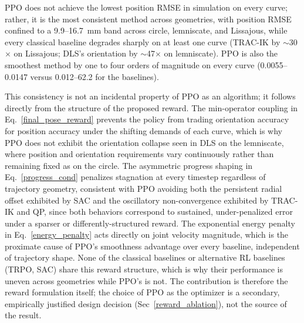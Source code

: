 \documentclass[preprint,12pt]{elsarticle}
\begin{document}
PPO does not achieve the lowest position RMSE in simulation on every
curve; rather, it is the most consistent method across geometries, with
position RMSE confined to a 9.9--16.7~mm band across circle, lemniscate,
and Lissajous, while every classical baseline degrades sharply on at
least one curve (TRAC-IK by $\sim$30$\times$ on Lissajous; DLS's
orientation by $\sim$47$\times$ on lemniscate). PPO is also the smoothest
method by one to four orders of magnitude on every curve
(0.0055--0.0147 versus 0.012--62.2 for the baselines).

This consistency is not an incidental property of PPO as an algorithm;
it follows directly from the structure of the proposed reward. The
min-operator coupling in Eq.~\ref{final_pose_reward} prevents the policy from trading orientation accuracy for position accuracy under the shifting demands of each curve, which is why PPO does not exhibit the orientation collapse seen in DLS on the lemniscate, where position and orientation
requirements vary continuously rather than remaining fixed as on the
circle. The asymmetric progress shaping in Eq.~\ref{progress_cond} penalizes stagnation at every timestep regardless of trajectory geometry, consistent with PPO avoiding both the persistent radial offset exhibited by SAC and the oscillatory non-convergence exhibited by TRAC-IK and QP, since both behaviors correspond to sustained, under-penalized error under a sparser or differently-structured reward. The exponential energy penalty in Eq.~\ref{energy_penalty} acts directly on joint velocity magnitude, which is the proximate cause of PPO's smoothness advantage over every baseline, independent of trajectory shape. None of the classical baselines or alternative RL baselines (TRPO, SAC) share this reward structure, which is why their performance is uneven across geometries while PPO's is not. The contribution is therefore the reward formulation itself; the choice of
PPO as the optimizer is a secondary, empirically justified design
decision (Sec~\ref{reward_ablation}), not the source of the result.





\end{document}

